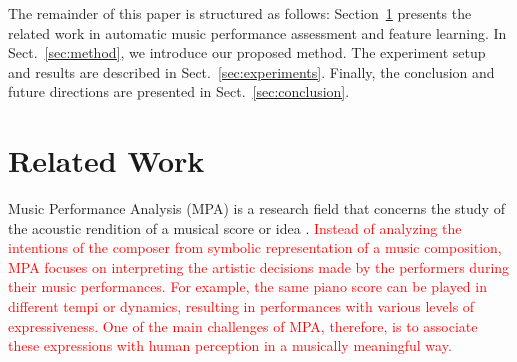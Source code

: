 \documentclass[conference]{IEEEtran}
\begin{document}
The remainder of this paper is structured as follows: Section~\ref{sec:relatedwork} presents the related work in automatic music performance assessment and feature learning. In Sect.~\ref{sec:method}, we introduce our proposed method. The experiment setup and results are described in Sect.~\ref{sec:experiments}. Finally, the conclusion and future directions are presented in Sect.~\ref{sec:conclusion}.

\section{Related Work}\label{sec:relatedwork}
Music Performance Analysis (MPA) is a research field that concerns the study of the acoustic rendition of a musical score or idea \cite{lerch_software-based_2009}. 
{\textcolor{red}{Instead of analyzing the intentions of the composer from symbolic representation of a music composition, MPA focuses on interpreting the artistic decisions made by the performers during their music performances. For example, the same piano score can be played in different tempi or dynamics, resulting in performances with various levels of expressiveness. One of the main challenges of MPA, therefore, is to associate these expressions with human perception in a musically meaningful way.}}
\end{document}
